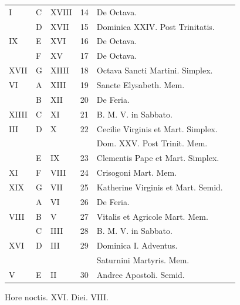 \begin{center}
\begin{tabular}{l | l | l | r | l l}
\color{Red} I & C & \color{Red} XVIII & 14 & De Octava. & \color{Red} \\
\color{Red}  & D & \color{Red} XVII & 15 & Dominica XXIV. Post Trinitatis. \\
\color{Red} IX & E & \color{Red} XVI & 16 & De Octava. & \color{Red} \\
\color{Red}  & F & \color{Red} XV & 17 & De Octava. \\
\color{Red} XVII & G & \color{Red} XIIII & 18 & Octava Sancti Martini. \color{Red} Simplex. \\
\color{Red} VI & \color{Red} A & \color{Red} XIII & 19 & Sancte Elysabeth. Mem. & \color{Red} \\
\color{Red}  & B & \color{Red} XII & 20 & De Feria. & \color{Red} \\
\color{Red} XIIII & C & \color{Red} XI & 21 & B. M. V. in Sabbato. & \color{Red} \\
\color{Red} III & D & \color{Red} X & 22 & \color{Red} Cecilie Virginis et Mart. Simplex. & \color{Red} \\
& & & & \quad Dom. XXV. Post Trinit. Mem. \\
\color{Red}  & E & \color{Red} IX & 23 & Clementis Pape et Mart. Simplex. & \color{Red} \\
\color{Red} XI & F & \color{Red} VIII & 24 & Crisogoni Mart. Mem. & \color{Red} \\
\color{Red} XIX & G & \color{Red} VII & 25 & \color{Red} Katherine Virginis et Mart. Semid. \\
\color{Red}  & \color{Red} A & \color{Red} VI & 26 & De Feria. & \color{Red} \\
\color{Red} VIII & B & \color{Red} V & 27 & Vitalis et Agricole Mart. Mem. & \color{Red} \\
\color{Red}  & C & \color{Red} IIII & 28 & B. M. V. in Sabbato. & \color{Red} \\
\color{Red} XVI & D & \color{Red} III & 29 & \color{Red} Dominica I. Adventus. \\
& & & & \quad \color{Red} Saturnini Martyris. Mem. & \\
\color{Red} V & E & \color{Red} II & 30 & Andree Apostoli. Semid. & \color{Red} \\
\end{tabular}
\newline \color{Red} Hore noctis. XVI. Diei. VIII.
\end{center}



